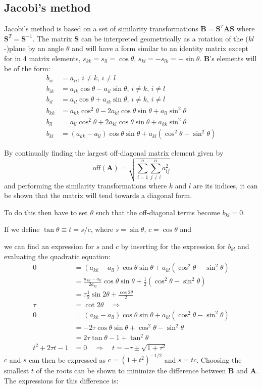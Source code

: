 \documentclass{article} %
\begin{document}
\subsection{Jacobi's method}\label{ss:jacobi}
Jacobi's method is based on a set of similarity transformations $\mathbf{B}=\mathbf{S}^T\mathbf{A}\mathbf{S}$ where $\mathbf{S}^T=\mathbf{S}^{-1}$. 
The matrix $\mathbf{S}$ can be interpreted geometrically as a rotation of the ($kl$-)plane by an angle $\theta$ and will have a form similar to an identity matrix except for in 4 matrix elements, $s_{kk}=s_{ll}=\cos\theta,\,s_{kl}=-s_{lk}=-\sin\theta$.
$\mathbf{B}$'s elements will be of the form:
\begin{align*}
	b_{ii}	&=	a_{ii},\, i\ne k,\,i\ne l\\
	b_{ik}	&=	a_{ik}\cos\theta - 	a_{il}\sin\theta,\, i\ne k,\,i\ne l\\
	b_{il}	&=	a_{il}\cos\theta + a_{ik}\sin\theta,\, i\ne k,\,i\ne l\\
	b_{kk}	&=	a_{kk}\cos^2\theta - 2a_{kl}\cos\theta\sin\theta + a_{ll}\sin^2\theta\\
	b_{ll}	&= 	a_{ll}\cos^2\theta + 2a_{kl}\cos\theta\sin\theta + a_{kk}\sin^2\theta\\
	b_{kl}	&= 	(a_{kk}-a_{ll})\cos\theta\sin\theta + a_{kl}(\cos^2\theta-\sin^2\theta)	
\end{align*}

By continually finding the largest off-diagonal matrix element given by 
\[
	\text{off}(\mathbf{A})=\sqrt{\sum_{i=1}^n\sum_{j\ne i}^n a_{ij}^2}
\]
and performing the similarity transformations where $k$ and $l$ are its indices, it can be shown that the matrix will tend towards a diagonal form.

To do this then have to set $\theta$ such that the off-diagonal terms become $b_{kl}=0$.

If we define $\tan\theta\equiv t=s/c$, where $s=\sin\theta,\,c=\cos\theta$ and 

we can find an expression for $s$ and $c$ by inserting for the expression for $b_{kl}$ and evaluating the quadratic equation:
\begin{align*}	
	0&= 	(a_{kk}-a_{ll})\cos\theta\sin\theta + a_{kl}(\cos^2\theta-\sin^2\theta)	\\
	&=\frac{a_{kk}-a_{ll}}{2a_{kl}}\cos\theta\sin\theta+\frac{1}{2}(\cos^2\theta-\sin^2\theta)\\
	&=\tau\frac{1}{2}\sin2\theta+\frac{\cos2\theta}{2}\\
	\tau&=\cot2\theta\quad\Rightarrow\\
	0&= 	(a_{kk}-a_{ll})\cos\theta\sin\theta + a_{kl}(\cos^2\theta-\sin^2\theta)	\\
	 &=-2\tau\cos\theta\sin\theta+\cos^2\theta-\sin^2\theta\\
	 &=2\tau\tan\theta-1+\tan^2\theta\\
	t^2+2\tau t-1 &=0\quad\Rightarrow\quad t=-\tau\pm\sqrt{1+\tau^2}
\end{align*}
$c$ and $s$ can then be expressed as $c=(1+t^2)^{-1/2}$ and $s=tc$. Choosing the smallest $t$ of the roots can be shown to minimize the difference between $\mathbf{B}$ and $\mathbf{A}$. The expressions for this difference is:
\end{document}
